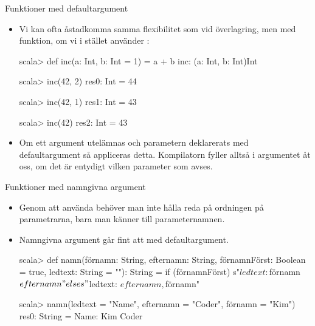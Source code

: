 \begin{Slide}{Funktioner med defaultargument}\SlideFontSmall

\begin{itemize}
\item Vi kan ofta åstadkomma samma flexibilitet som vid överlagring, men med  funktion, om vi i stället använder :
\begin{REPLnonum}
scala> def inc(a: Int, b: Int = 1) = a + b
inc: (a: Int, b: Int)Int

scala> inc(42, 2)
res0: Int = 44

scala> inc(42, 1)
res1: Int = 43

scala> inc(42)
res2: Int = 43

\end{REPLnonum}
\item Om ett argument utelämnas och parametern deklarerats med defaultargument så appliceras detta. Kompilatorn fyller alltså i argumentet åt oss, om det är entydigt vilken parameter som avses.
\end{itemize}
\end{Slide}


\begin{Slide}{Funktioner med namngivna argument}
\begin{itemize}
\item Genom att använda  behöver man inte hålla reda på ordningen på parametrarna, bara man känner till parameternamnen.
\item Namngivna argument går fint att  med defaultargument.
\begin{REPL}
scala> def namn(förnamn: String,
                efternamn: String,
                förnamnFörst: Boolean = true,
                ledtext: String = ""): String =
         if (förnamnFörst) s"$ledtext: $förnamn $efternamn"
         else s"$ledtext: $efternamn, $förnamn"

scala> namn(ledtext = "Name", efternamn = "Coder", förnamn = "Kim")
res0: String = Name: Kim Coder
\end{REPL}
\end{itemize}
\end{Slide}



